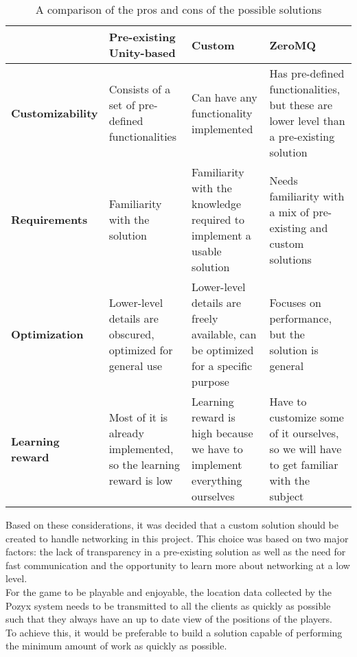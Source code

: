 \begin{table}[H]
    \begin{tabularx}{\textwidth}{|X|X|X|X|}
        \hline

         & \textbf{Pre-existing Unity-based}
         & \textbf{Custom}
         & \textbf{ZeroMQ}
        \\ \hline
        \textbf{Customizability}
         & Consists of a set of pre-defined functionalities
         & Can have any functionality implemented
         & Has pre-defined functionalities, but these are lower level than a pre-existing solution
        \\ \hline
        \textbf{Requirements}
         & Familiarity with the solution
         & Familiarity with the knowledge required to implement a usable solution
         & Needs familiarity with a mix of pre-existing and custom solutions
        \\ \hline
        \textbf{Optimization}
         & Lower-level details are obscured, optimized for general use
         & Lower-level details are freely available, can be optimized for a specific purpose
         & Focuses on performance, but the solution is general
        \\ \hline
        \textbf{Learning reward}
         & Most of it is already implemented, so the learning reward is low
         & Learning reward is high because we have to implement everything ourselves
         & Have to customize some of it ourselves, so we will have to get familiar with the subject
        \\ \hline
    \end{tabularx}
    \caption{A comparison of the pros and cons of the possible solutions}
    \label{tab:networkprosandcons}
\end{table}
\noindent
Based on these considerations, it was decided that a custom solution should be created to handle networking in this project.
This choice was based on two major factors: the lack of transparency in a pre-existing solution as well as the need for fast communication and the opportunity to learn more about networking at a low level. \\
For the game to be playable and enjoyable, the location data collected by the Pozyx system needs to be transmitted to all the clients as quickly as possible such that they always have an up to date view of the positions of the players.\\
To achieve this, it would be preferable to build a solution capable of performing the minimum amount of work as quickly as possible.
